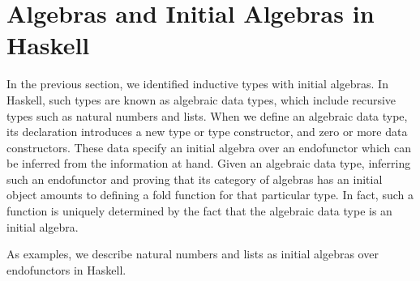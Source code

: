 \section{Algebras and Initial Algebras in Haskell}
\label{sec:algebras-haskell}

In the previous section, we identified inductive types with initial
algebras. In Haskell, such types are known as algebraic data types,
which include recursive types such as natural numbers and lists. When
we define an algebraic data type, its declaration introduces a new
type or type constructor, and zero or more data constructors. These
data specify an initial algebra over an endofunctor which can be
inferred from the information at hand. Given an algebraic data type,
inferring such an endofunctor and proving that its category of
algebras has an initial object amounts to defining a fold function for
that particular type. In fact, such a function is uniquely determined
by the fact that the algebraic data type is an initial algebra.

As examples, we describe natural numbers and lists as initial algebras
over endofunctors in Haskell.


